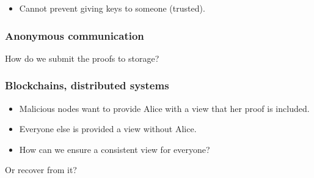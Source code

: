 \begin{frame}
  \begin{remark}
    \begin{itemize}
      \item Cannot prevent giving keys to someone (trusted).
    \end{itemize}
  \end{remark}
\end{frame}

\begin{frame}
  \frametitle{Anonymous communication}
  \begin{question}
    How do we submit the proofs to storage?
  \end{question}

\end{frame}

\begin{frame}
  \frametitle{Blockchains, distributed systems}
  \begin{question}
    \begin{itemize}
      \item Malicious nodes want to provide Alice with a view that her proof is 
        included.
      \item Everyone else is provided a view without Alice.
      \item How can we ensure a consistent view for everyone?
    \end{itemize}
  \end{question}

  \begin{question}
    Or recover from it?
  \end{question}
\end{frame}


